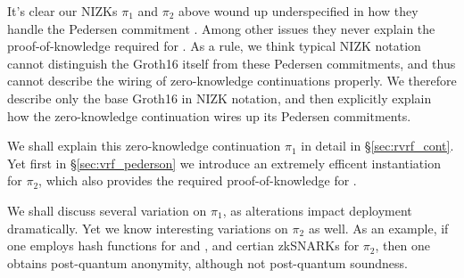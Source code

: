 It's clear our NIZKs $\pi_1$ and $\pi_2$ above wound up underspecified
in how they handle the Pedersen commitment \compk.  Among other issues
they never explain the proof-of-knowledge required for \compk.
As a rule, we think typical NIZK notation cannot distinguish the Groth16
itself from these Pedersen commitments, and thus cannot describe the
wiring of zero-knowledge continuations properly.
We therefore describe only the base Groth16 in NIZK notation, and then
explicitly explain how the zero-knowledge continuation wires up its
Pedersen commitments.

We shall explain this zero-knowledge continuation $\pi_1$ in detail
in \S\ref{sec:rvrf_cont}.  Yet first in \S\ref{sec:vrf_pederson}
we introduce an extremely efficent instantiation for $\pi_2$, which
also provides the required proof-of-knowledge for \compk.

We shall discuss several variation on $\pi_1$, as alterations impact
deployment dramatically.  Yet we know interesting variations on $\pi_2$
as well.  As an example, if one employs hash functions for \CommitKey
and \PRF, and certian zkSNARKs for $\pi_2$, then one obtains post-quantum
anonymity, although not post-quantum soundness.

